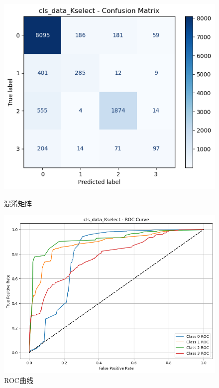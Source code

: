 \documentclass[10pt]{article}
\begin{document}
\begin{figure}[H]
\centering
\begin{minipage}[t]{0.45\textwidth}
  \centering
  \includegraphics[width=\linewidth]{cls_svm_10s.png}
  \caption{混淆矩阵}
  \label{fig:73}
\end{minipage}
\hfill
\begin{minipage}[t]{0.52\textwidth}
  \centering
  \includegraphics[width=\linewidth]{cls_svm_10s2.png}
  \caption{ROC曲线}
  \label{fig:74}
\end{minipage}
\end{figure}
\end{document}
